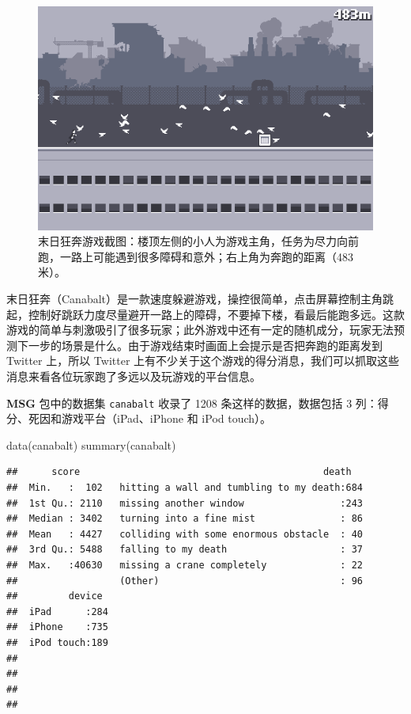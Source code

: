 \documentclass[
  b5paper,
  UTF8,twoside]{book}
\newenvironment{Shaded}{\begin{snugshade}}{\end{snugshade}}
\newcommand{\FunctionTok}[1]{\textcolor[rgb]{0.00,0.00,0.00}{#1}}
\newcommand{\NormalTok}[1]{#1}
\begin{document}
\begin{figure}

{\centering \includegraphics{images/canabalt-screenshot} 

}

\caption[末日狂奔游戏截图]{末日狂奔游戏截图：楼顶左侧的小人为游戏主角，任务为尽力向前跑，一路上可能遇到很多障碍和意外；右上角为奔跑的距离（483 米）。}\label{fig:canabalt-screenshot}
\end{figure}



末日狂奔（Canabalt）是一款速度躲避游戏，操控很简单，点击屏幕控制主角跳起，控制好跳跃力度尽量避开一路上的障碍，不要掉下楼，看最后能跑多远。这款游戏的简单与刺激吸引了很多玩家；此外游戏中还有一定的随机成分，玩家无法预测下一步的场景是什么。由于游戏结束时画面上会提示是否把奔跑的距离发到 Twitter 上，所以 Twitter 上有不少关于这个游戏的得分消息，我们可以抓取这些消息来看各位玩家跑了多远以及玩游戏的平台信息。

\textbf{MSG} 包中的数据集 \texttt{canabalt} 收录了 1208 条这样的数据，数据包括 3 列：得分、死因和游戏平台（iPad、iPhone 和 iPod touch）。

\begin{Shaded}
\begin{Highlighting}[]
\FunctionTok{data}\NormalTok{(canabalt)}
\FunctionTok{summary}\NormalTok{(canabalt)}
\end{Highlighting}
\end{Shaded}

\begin{verbatim}
##      score                                           death    
##  Min.   :  102   hitting a wall and tumbling to my death:684  
##  1st Qu.: 2110   missing another window                 :243  
##  Median : 3402   turning into a fine mist               : 86  
##  Mean   : 4427   colliding with some enormous obstacle  : 40  
##  3rd Qu.: 5488   falling to my death                    : 37  
##  Max.   :40630   missing a crane completely             : 22  
##                  (Other)                                : 96  
##         device   
##  iPad      :284  
##  iPhone    :735  
##  iPod touch:189  
##                  
##                  
##                  
## 
\end{verbatim}
\end{document}
